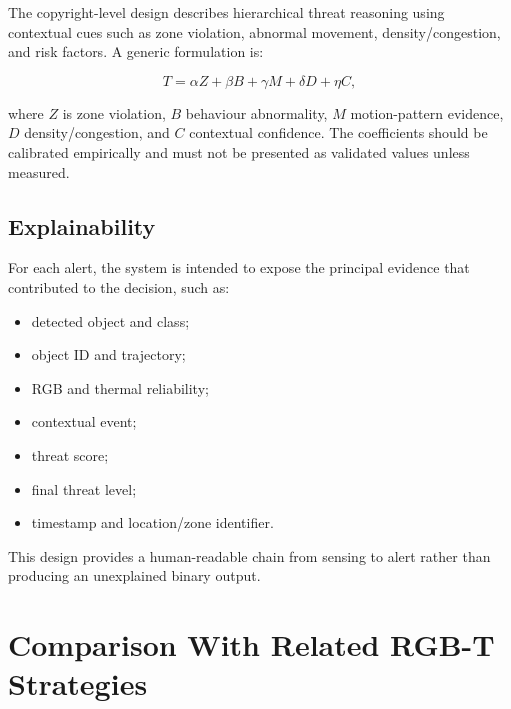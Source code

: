 \documentclass[conference]{IEEEtran}
\begin{document}
The copyright-level design describes hierarchical threat reasoning using contextual cues such as zone violation, abnormal movement, density/congestion, and risk factors. A generic formulation is:

\begin{equation}
T=
\alpha Z+
\beta B+
\gamma M+
\delta D+
\eta C,
\label{eq:threat}
\end{equation}

where $Z$ is zone violation, $B$ behaviour abnormality, $M$ motion-pattern evidence, $D$ density/congestion, and $C$ contextual confidence. The coefficients should be calibrated empirically and must not be presented as validated values unless measured.

\subsection{Explainability}

For each alert, the system is intended to expose the principal evidence that contributed to the decision, such as:

\begin{itemize}
    \item detected object and class;
    \item object ID and trajectory;
    \item RGB and thermal reliability;
    \item contextual event;
    \item threat score;
    \item final threat level;
    \item timestamp and location/zone identifier.
\end{itemize}

This design provides a human-readable chain from sensing to alert rather than producing an unexplained binary output.


\section{Comparison With Related RGB-T Strategies}
\end{document}
